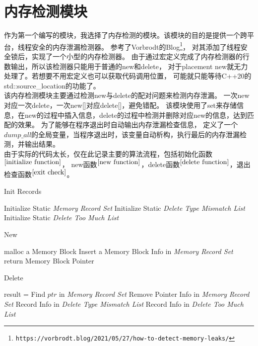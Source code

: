 \section{内存检测模块}

作为第一个编写的模块，我选择了内存检测的模块。该模块的目的是提供一个跨平台，线程安全的内存泄漏检测器。
参考了Vorbrodt的Blog\footnote{\nolinkurl{https://vorbrodt.blog/2021/05/27/how-to-detect-memory-leaks/}}，
对其添加了线程安全锁后，实现了一个小型的内存检测器。
由于通过宏定义完成了内存检测器的行数输出，所以该检测器只能用于普通的new和delete，
对于placement new就无力处理了。若想要不用宏定义也可以获取代码调用位置，
可能就只能等待C++20的std::source\_location的功能了。\\

该内存检测模块主要通过检测new与delete的配对问题来检测内存泄漏。
一次new对应一次delete，一次new[]对应delete[]，避免错配。
该模块使用了set来存储信息，在new的过程中插入信息，delete的过程中检测并删除对应new的信息，达到匹配的效果。
为了能够在程序退出时自动输出内存泄漏检查信息，
定义了一个$dump\_all$的全局变量，当程序退出时，该变量自动析构，执行最后的内存泄漏检测，并输出结果。\\

由于实际的代码太长，仅在此记录主要的算法流程，包括初始化函数$^{\ref{initialize function}}$，
new函数$^{\ref{new function}}$，delete函数$^{\ref{delete function}}$，退出检查函数$^{\ref{exit check}}$。

\begin{breakablealgorithm}
\caption{Init Records} \label{initialize function}
\begin{algorithmic}
        \State Initialize Static \emph{Memory Record Set}
        \State Initialize Static \emph{Delete Type Mismatch List}
        \State Initialize Static \emph{Delete Too Much List}
\EndProcedure
\end{algorithmic}
\end{breakablealgorithm}

\begin{breakablealgorithm}
\caption{New} \label{new function}
\begin{algorithmic}
                  
    \State malloc a Memory Block
    \State Insert a Memory Block Info in \emph{Memory Record Set}
    \State return Memory Block Pointer
\EndProcedure
\end{algorithmic}
\end{breakablealgorithm}

\begin{breakablealgorithm}
\caption{Delete} \label{delete function}
\begin{algorithmic}                     
    \State result = Find $ptr$ in \emph{Memory Record Set}
            \State Remove Pointer Info in \emph{Memory Record Set}
        \Else
            \State Record Info in \emph{Delete Type Mismatch List}
        \EndIf
    \Else
        \State Record Info in \emph{Delete Too Much List}
    \EndIf
\EndProcedure
\end{algorithmic}
\end{breakablealgorithm}

